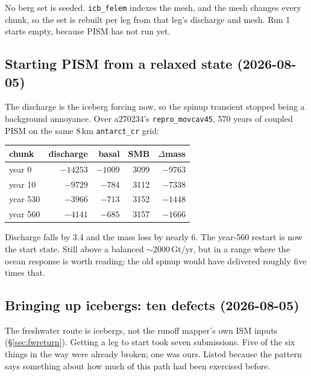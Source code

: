 \documentclass[11pt,a4paper]{article}
\newcommand{\code}[1]{\texttt{\small #1}}
\begin{document}
No berg set is seeded. \code{icb\_felem} indexes the mesh, and the mesh changes every chunk, so the
set is rebuilt per leg from that leg's discharge and mesh. Run 1 starts empty, because PISM has not
run yet.

\subsection{Starting PISM from a relaxed state (2026-08-05)}
\label{sec:spinup}

The discharge is the iceberg forcing now, so the spinup transient stopped being a background
annoyance. Over a270234's \code{repro\_movcav45}, 570 years of coupled PISM on the same 8\,km
\code{antarct\_cr} grid:

\begin{center}
\begin{tabular}{@{}lrrrr@{}}
\toprule
chunk & discharge & basal & SMB & $\Delta$mass \\
\midrule
year 0   & $-14253$ & $-1009$ & 3099 & $-9763$ \\
year 10  & $-9729$  & $-784$  & 3112 & $-7338$ \\
year 530 & $-3966$  & $-713$  & 3152 & $-1448$ \\
year 560 & $-4141$  & $-685$  & 3157 & $-1666$ \\
\bottomrule
\end{tabular}
\end{center}

\noindent
Discharge falls by 3.4 and the mass loss by nearly 6. The year-560 restart is now the start state.
Still above a balanced $\sim$2000\,Gt/yr, but in a range where the ocean response is worth reading;
the old spinup would have delivered roughly five times that.

\subsection{Bringing up icebergs: ten defects (2026-08-05)}
\label{sec:icb}

The freshwater route is icebergs, not the runoff mapper's own ISM inputs
(\S\ref{sec:fwreturn}). Getting a leg to start took seven submissions. Five of the six things in
the way were already broken; one was ours. Listed because the pattern says something about how
much of this path had been exercised before.
\end{document}
